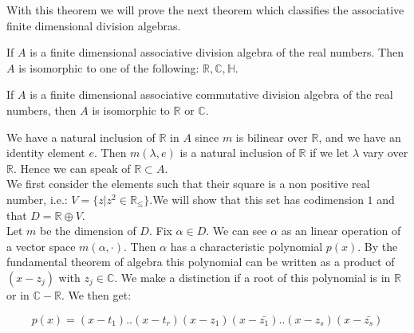 \documentclass[../Thesis.tex]{subfiles}
\begin{document}
With this theorem we will prove the next theorem which classifies the associative finite dimensional division algebras.
\begin{theorem}

If $A$ is a finite dimensional associative division algebra of the real numbers. Then $A$ is isomorphic to one of the following: $\mathbb{R}, \mathbb{C},\mathbb{H}$. 
\end{theorem}
\begin{Cor}
If $A$ is a finite dimensional associative commutative division algebra of the real numbers, then $A$ is isomorphic to $\mathbb{R}$ or $\mathbb{C}$.
\end{Cor}
\begin{myproof}
We have a natural inclusion of $\mathbb{R}$ in $A$ since $m$ is bilinear over $\mathbb{R}$, and we have an identity element $e$. Then $m(\lambda,e)$ is a natural inclusion of $\mathbb{R}$ if we let $\lambda$ vary over $\mathbb{R}$. Hence we can speak of $\mathbb{R} \subset A$.
\\We first consider the elements such that their square is a non positive real number, i.e.: $V = \{ z| z^2 \in \mathbb{R}_\leq \}$.We will show that this set has codimension $1$ and that $D = \mathbb{R} \oplus V$.
\\Let $m$ be the dimension of $D$. Fix $\alpha \in D$. We can see $\alpha$ as an linear operation of a vector space $m(\alpha,\cdot)$. Then $\alpha$ has a characteristic polynomial $p(x)$. By the fundamental theorem of algebra this polynomial can be written as a product of $(x- z_j)$ with $z_j \in \mathbb{C}$. We make a distinction if a root of this polynomial is in $\mathbb{R}$ or in $\mathbb{C}-\mathbb{R}$. We then get:

\begin{equation}
p(x) = (x- t_1)..(x-t_r)(x - z_1)(x - \bar{z_1}) .. (x - z_s)(x - \bar{z_s})
\end{equation}


\end{myproof}
\end{document}
